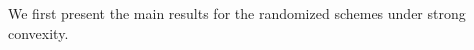 \documentclass[12pt]{article}
\numberwithin{equation}{section}
\begin{document}



We first present the main results for the randomized schemes
under strong convexity.
\end{document}
